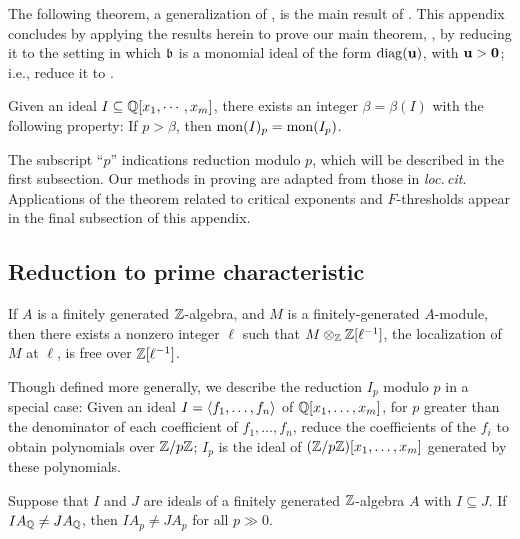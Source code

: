 \documentclass[11pt]{amsart}
\begin{document}
The following theorem, a generalization of \cite[Lemma 6.1]{budur+mustata+saito.roots_bs_polys_monomial}, is the main result of .  This appendix concludes by applying the results herein to prove our main theorem, , by reducing it to the setting in which $\mathfrak{b}$ is a monomial ideal of the form $\operatorname{diag}(\mathbf{u})$, with $\mathbf{u} > \mathbf{0}$; i.e., reduce it to .


\begin{theorem}
\label{mon-operation-modulo-p: T}
Given an ideal $I \subseteq \mathbb{Q}[x_1, \cdots, x_m]$, there exists an integer $\beta = \beta(I)$ with the following property:  If $p > \beta$, then $\operatorname{mon}(I)_p = \operatorname{mon}(I_p)$.
\end{theorem}

The subscript ``$p$'' indications reduction modulo $p$, which will be described in the first subsection. 
Our methods in proving  are adapted from those in \emph{loc.\,cit}.
Applications of the theorem related to critical exponents and $F$-thresholds 
appear in the final subsection of this appendix. 

\subsection{Reduction to prime characteristic}

\begin{remark} \label{generic-freeness} If $A$ is a finitely generated $\mathbb{Z}$-algebra, and $M$ is a finitely-generated $A$-module, then there exists a nonzero integer $\ell$ such that $M \otimes_{\mathbb{Z}} \mathbb{Z}[\ell^{-1}]$, the localization of $M$ at $\ell$, is free over $\mathbb{Z}[\ell^{-1}]$.
\end{remark}

Though defined more generally, we describe the reduction $I_p$ modulo $p$ in a special case: 
Given an ideal $I = \langle f_1, \ldots, f_n \rangle$ of $\mathbb{Q}[x_1, \ldots, x_m]$, for $p$ greater than the denominator of each coefficient of $f_1, \ldots, f_n$, reduce the coefficients of the $f_i$ to obtain polynomials over $\mathbb{Z}/p\mathbb{Z}$; $I_p$ is the ideal of $(\mathbb{Z}/p\mathbb{Z})[x_1, \ldots, x_m]$ generated by these polynomials.

\begin{lemma}
\label{noncontainment mod p: L}
Suppose that $I$ and $J$ are ideals of a finitely generated $\mathbb{Z}$-algebra $A$ with $I \subseteq J$.  If $IA_{\mathbb{Q}} \neq JA_{\mathbb{Q}}$, then $IA_p \neq JA_p$ for all $p \gg 0$.
\end{lemma}
\end{document}
